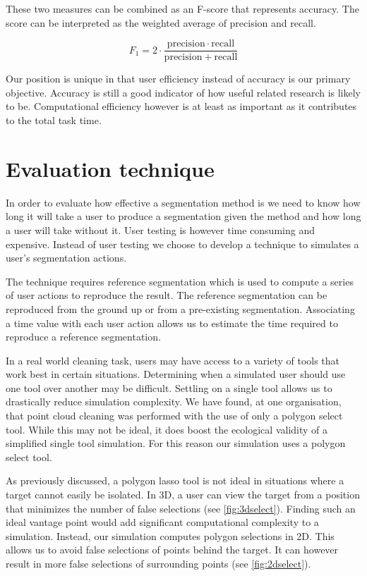 These two measures can be combined as an F-score that represents accuracy. The score can be interpreted as the weighted average of precision and recall.

\begin{equation} \label{eq:f1score}
	F_1 = 2 \cdot \frac{\mathrm{precision} \cdot \mathrm{recall}}{\mathrm{precision} + \mathrm{recall}}
\end{equation}

Our position is unique in that user efficiency instead of accuracy is our primary objective. Accuracy is still a good indicator of how useful related research is likely to be. Computational efficiency however is at least as important as it contributes to the total task time.

\section{Evaluation technique}
In order to evaluate how effective a segmentation method is we need to know how long it will take a user to produce a segmentation given the method and how long a user will take without it. User testing is however time consuming and expensive. Instead of user testing we choose to develop a technique to simulates a user's segmentation actions.

The technique requires reference segmentation which is used to compute a series of user actions to reproduce the result. The reference segmentation can be reproduced from the ground up or from a pre-existing segmentation. Associating a time value with each user action allows us to estimate the time required to reproduce a reference segmentation.

In a real world cleaning task, users may have access to a variety of tools that work best in certain situations. Determining when a simulated user should use one tool over another may be difficult. Settling on a single tool allows us to drastically reduce simulation complexity. We have found, at one organisation, that point cloud cleaning was performed with the use of only a polygon select tool. While this may not be ideal, it does boost the ecological validity of a simplified single tool simulation. For this reason our simulation uses a polygon select tool.

As previously discussed, a polygon lasso tool is not ideal in situations where a target cannot easily be isolated. In 3D, a user can view the target from a position that minimizes the number of false selections (see \autoref{fig:3dselect}). Finding such an ideal vantage point would add significant computational complexity to a simulation. Instead, our simulation computes polygon selections in 2D. This allows us to avoid false selections of points behind the target. It can however result in more false selections of surrounding points (see \autoref{fig:2dselect}).

